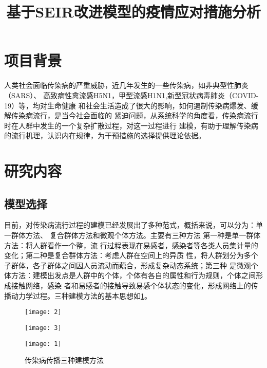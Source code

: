 \documentclass[withoutpreface,bwprint]{cumcmthesis}
\title{基于SEIR改进模型的疫情应对措施分析}
\begin{document}
\maketitle

\section{项目背景}
人类社会面临传染病的严重威胁，近几年发生的一些传染病，如非典型性肺炎（SARS）、
高致病性禽流感H5N1，甲型流感H1N1,新型冠状病毒肺炎（COVID-19）等，均对生命健康
和社会生活造成了很大的影响，如何遏制传染病爆发、缓解传染病流行，是当今社会面临的
紧迫问题，从系统科学的角度看，传染病流行时在人群中发生的一个复杂扩散过程，对这一过程进行
建模，有助于理解传染病的流行机理，认识内在规律，为干预措施的选择提供理论依据。

\section{研究内容}
\subsection{模型选择}
目前，对传染病流行过程的建模已经发展出了多种范式，概括来说，可以分为：单一群体方法、
复合群体方法和微观个体方法。主要有三种方法 第一种是单一群体方法：将人群看作一个整，流
行过程表现在易感者，感染者等各类人员集计量的变化；第二种是复合群体方法：考虑人群在空间上的异质
性，将人群划分为多个子群体，各子群体之间因人员流动而藕合，形成复杂动态系统；第三种
是微观个体方法：建模出发点是人群中的个体，个体有各自的属性和行为规则，个体之间形成接触网络，感染
者和易感者的接触导致易感个体状态的变化，形成网络上的传播动力学过程。三种建模方法的基本思想如\cref{fig:1}。
\begin{figure}[!h]
    \centering
    \begin{minipage}[c]{0.3\textwidth}
        \centering
        \texttt{[image: 2]}
        \label{fig:1.1}
    \end{minipage}
    \begin{minipage}[c]{0.3\textwidth}
        \centering
        \texttt{[image: 3]}
        \label{fig:1.2}
    \end{minipage}
    \begin{minipage}[c]{0.3\textwidth}
        \centering
        \texttt{[image: 1]}
        \label{fig:1.3}
    \end{minipage}
    \caption{传染病传播三种建模方法}
    \label{fig:1}
\end{figure}
\end{document}
